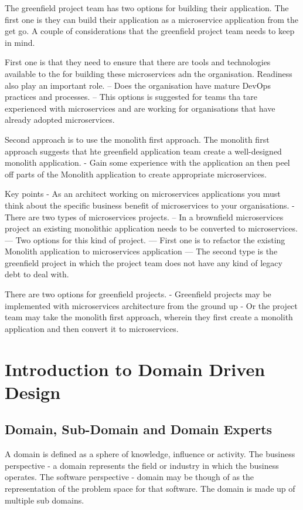 \documentclass[a4paper, 11pt]{book}
\begin{document}
    The greenfield project team has two options for building their application.
    The first one is they can build their application as a microservice application from the get go.
    A couple of considerations that the greenfield project team needs to keep in mind.

    First one is that they need to ensure that there are tools and technologies available to the for building these microservices adn the organisation.
    Readiness also play an important role.
    -- Does the organisation have mature DevOps practices and processes.
    -- This options is suggested for teams tha tare experienced with microservices and are working for organisations that have already adopted microservices.

    Second approach is to use the monolith first approach.
    The monolith first approach suggests that hte greenfield application team create a well-designed monolith application.
    - Gain some experience with the application an then peel off parts of the Monolith application to create appropriate microservices.

    Key points
    - As an architect working on microservices applications you must think about the specific business benefit of microservices to your organisations.
    - There are two types of microservices projects.
    -- In a brownfield microservices project an existing monolithic application needs to be converted to microservices.
    --- Two options for this kind of project.
    --- First one is to refactor the existing Monolith application to microservices application
    --- The second type is the greenfield project in which the project team does not have any kind of legacy debt to deal with.

    There are two options for greenfield projects.
    - Greenfield projects may be implemented with microservices architecture from the ground up
    - Or the project team may take the monolith first approach, wherein they first create a monolith application and then convert it to microservices.


    \chapter{Introduction to Domain Driven Design}


    \section{Domain, Sub-Domain and Domain Experts}
    A domain is defined as a sphere of knowledge, influence or activity.
    The business perspective - a domain represents the field or industry in which the business operates.
    The software perspective - domain may be though of as the representation of the problem space for that software. The domain is made up of multiple sub domains.
\end{document}
